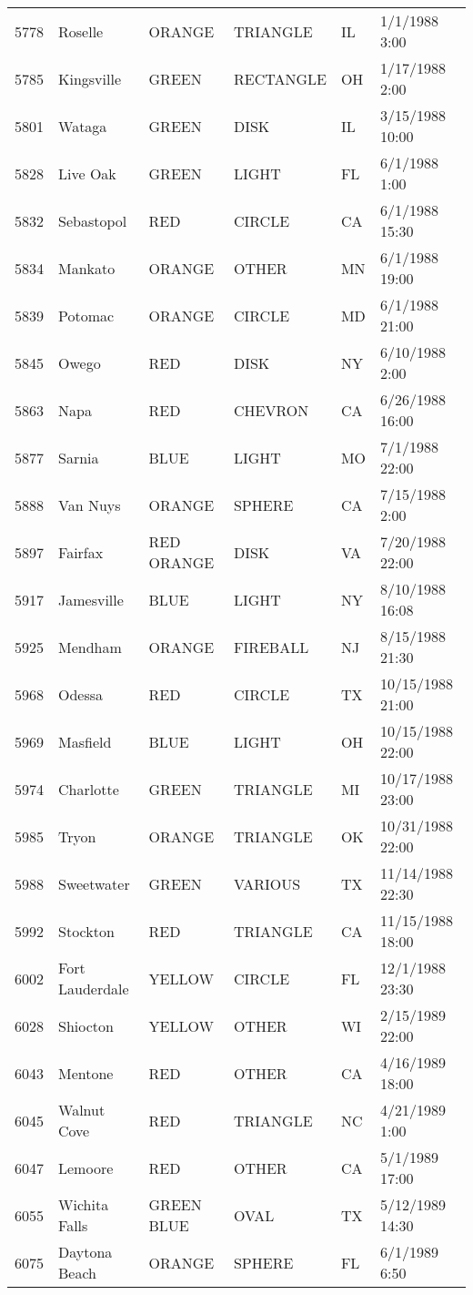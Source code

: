 \begin{tabular}{llllll}
5778 & Roselle & ORANGE & TRIANGLE & IL & 1/1/1988 3:00 \\
5785 & Kingsville & GREEN & RECTANGLE & OH & 1/17/1988 2:00 \\
5801 & Wataga & GREEN & DISK & IL & 3/15/1988 10:00 \\
5828 & Live Oak & GREEN & LIGHT & FL & 6/1/1988 1:00 \\
5832 & Sebastopol & RED & CIRCLE & CA & 6/1/1988 15:30 \\
5834 & Mankato & ORANGE & OTHER & MN & 6/1/1988 19:00 \\
5839 & Potomac & ORANGE & CIRCLE & MD & 6/1/1988 21:00 \\
5845 & Owego & RED & DISK & NY & 6/10/1988 2:00 \\
5863 & Napa & RED & CHEVRON & CA & 6/26/1988 16:00 \\
5877 & Sarnia & BLUE & LIGHT & MO & 7/1/1988 22:00 \\
5888 & Van Nuys & ORANGE & SPHERE & CA & 7/15/1988 2:00 \\
5897 & Fairfax & RED ORANGE & DISK & VA & 7/20/1988 22:00 \\
5917 & Jamesville & BLUE & LIGHT & NY & 8/10/1988 16:08 \\
5925 & Mendham & ORANGE & FIREBALL & NJ & 8/15/1988 21:30 \\
5968 & Odessa & RED & CIRCLE & TX & 10/15/1988 21:00 \\
5969 & Masfield & BLUE & LIGHT & OH & 10/15/1988 22:00 \\
5974 & Charlotte & GREEN & TRIANGLE & MI & 10/17/1988 23:00 \\
5985 & Tryon & ORANGE & TRIANGLE & OK & 10/31/1988 22:00 \\
5988 & Sweetwater & GREEN & VARIOUS & TX & 11/14/1988 22:30 \\
5992 & Stockton & RED & TRIANGLE & CA & 11/15/1988 18:00 \\
6002 & Fort Lauderdale & YELLOW & CIRCLE & FL & 12/1/1988 23:30 \\
6028 & Shiocton & YELLOW & OTHER & WI & 2/15/1989 22:00 \\
6043 & Mentone & RED & OTHER & CA & 4/16/1989 18:00 \\
6045 & Walnut Cove & RED & TRIANGLE & NC & 4/21/1989 1:00 \\
6047 & Lemoore & RED & OTHER & CA & 5/1/1989 17:00 \\
6055 & Wichita Falls & GREEN BLUE & OVAL & TX & 5/12/1989 14:30 \\
6075 & Daytona Beach & ORANGE & SPHERE & FL & 6/1/1989 6:50 \\

\end{tabular}
